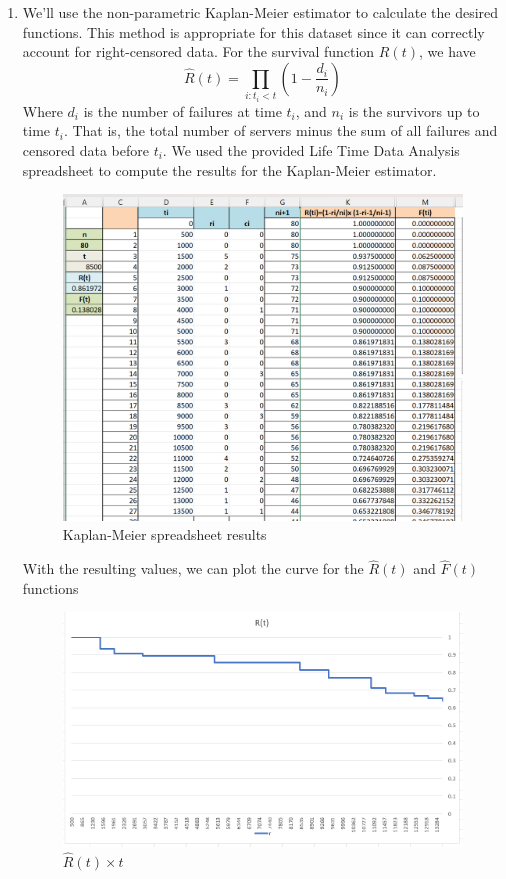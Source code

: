 \documentclass{article}
\begin{document}
\begin{enumerate}[label=(\alph*)]
    \item We'll use the non-parametric Kaplan-Meier estimator to calculate the desired functions. This method is appropriate for this dataset since it can correctly account for right-censored data. For the survival function $R(t)$, we have
    \[\hat{R}(t) = \prod_{i: t_i<t} \left(1- \frac{d_i}{n_i}\right)\]
    Where $d_i$ is the number of failures at time $t_i$, and $n_i$ is the survivors up to time $t_i$. That is, the total number of servers minus the sum of all failures and censored data before $t_i$.
    We used the provided Life Time Data Analysis spreadsheet to compute the results for the Kaplan-Meier estimator.

    \begin{figure}[H]
        \centering
        \includegraphics[width=0.5\linewidth]{q3_sheet.png}
        \caption{Kaplan-Meier spreadsheet results}
        \label{fig:q3_km1}
    \end{figure}

    With the resulting values, we can plot the curve for the $\hat{R}(t)$ and $\hat{F}(t)$ functions

    \begin{figure}[H]
        \centering
        \includegraphics[width=0.8\linewidth]{q3_rt.png}
        \caption{$\hat{R}(t) \times t$}
        \label{fig:q3_km_rt}
    \end{figure}


\end{enumerate}
\end{document}
